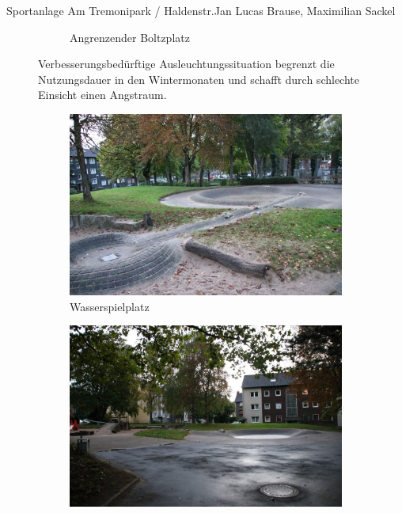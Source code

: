 \documentclass{../../templates/amendment}
\begin{document}
\begin{boxed}{Sportanlage Am Tremonipark / Haldenstr.}{Jan Lucas Brause, Maximilian Sackel}
\begin{figure}[htpb]
\begin{subfigure}[]{0.49\textwidth}
\begin{center}
                \caption{Angrenzender Boltzplatz}%
            \end{center}
        \end{subfigure}
        \caption{Verbesserungsbedürftige Ausleuchtungssituation begrenzt die
            Nutzungsdauer in den Wintermonaten und schafft durch schlechte Einsicht
        einen Angstraum.}
    \end{figure}

    \begin{figure}[htpb]
        \centering
        \begin{subfigure}[]{0.49\textwidth}
            \begin{center}
                \includegraphics[width=\linewidth]{pictures/photo2.jpg}
                \caption{Wasserspielplatz}%
            \end{center}
        \end{subfigure}
        \begin{subfigure}[]{0.49\textwidth}
            \begin{center}
                \includegraphics[width=\linewidth]{pictures/photo4.jpg}

\end{center}
\end{subfigure}
\end{figure}
\end{boxed}
\end{document}
